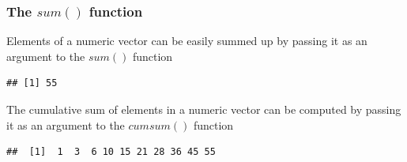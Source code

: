 \subsubsection{The $sum()$ function}
\noindent Elements of a numeric vector can be easily summed up by passing it as an argument to the $sum()$ function
\begin{knitrout}
\color{fgcolor}\begin{kframe}
\begin{alltt}
\hlkwb{<-}\hlopt{:} 
 
\end{alltt}
\begin{verbatim}
## [1] 55
\end{verbatim}
\end{kframe}
\end{knitrout}
\noindent The cumulative sum of elements in a numeric vector can be computed by passing it as an argument to the $cumsum()$ function
\begin{knitrout}
\color{fgcolor}\begin{kframe}
\begin{alltt}
\hlkwb{<-}\hlopt{:} 
 
\end{alltt}
\begin{verbatim}
##  [1]  1  3  6 10 15 21 28 36 45 55
\end{verbatim}
\end{kframe}
\end{knitrout}

